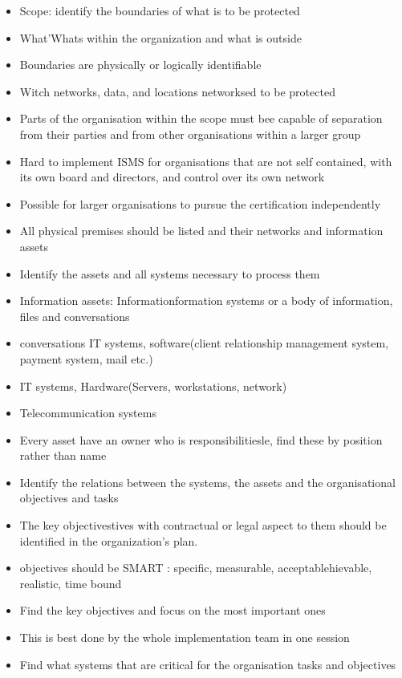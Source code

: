 \begin{itemize}
\item Scope: identify the boundaries of what is to be protected
\item What'Whats within the organization and what is outside
\item Boundaries are physically or logically identifiable
\item Witch networks, data, and locations networksed to be protected
   \item  Parts of the organisation within the scope must bee capable of separation from their parties and from other organisations within a larger group
   \item  Hard to implement ISMS for organisations that are not self contained, with its own board and directors, and control over its own network
   \item Possible for larger organisations to pursue the certification independently 
   \item All physical premises should be listed and their networks and information assets
   \item Identify the assets and all systems necessary to process them
   \item Information assets: Informationformation systems or a body of information, files and conversations 
   \item conversations IT systems, software(client relationship management system, payment system, mail etc.)
   \item IT systems, Hardware(Servers, workstations, network)
   \item Telecommunication systems
   \item Every asset have an owner who is responsibilitiesle, find these by position rather than name
   \item Identify the relations between the systems, the assets and the organisational objectives and tasks
   \item The key objectivestives with contractual or legal aspect to them should be identified in the organization's plan.
   \item objectives should be SMART : specific, measurable, acceptablehievable, realistic, time bound
   \item Find the key objectives and focus on the most important ones
   \item This is best done by the whole implementation team in one session 
   \item Find what systems that are critical for the organisation tasks and objectives

\end{itemize}
